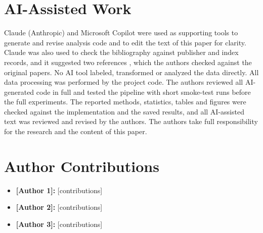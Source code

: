 \documentclass[conference]{IEEEtran}
\begin{document}
\section*{AI-Assisted Work}

Claude (Anthropic) and Microsoft Copilot were used as supporting tools to generate and revise analysis code and to edit the text of this paper for clarity. Claude was also used to check the bibliography against publisher and index records, and it suggested two references \cite{pfurtscheller2006,luo2018}, which the authors checked against the original papers. No AI tool labeled, transformed or analyzed the data directly. All data processing was performed by the project code. The authors reviewed all AI-generated code in full and tested the pipeline with short smoke-test runs before the full experiments. The reported methods, statistics, tables and figures were checked against the implementation and the saved results, and all AI-assisted text was reviewed and revised by the authors. The authors take full responsibility for the research and the content of this paper.

\section*{Author Contributions}

\begin{itemize}
  \item \textbf{[Author 1]:} [contributions]
  \item \textbf{[Author 2]:} [contributions]
  \item \textbf{[Author 3]:} [contributions]
\end{itemize}



\end{document}
